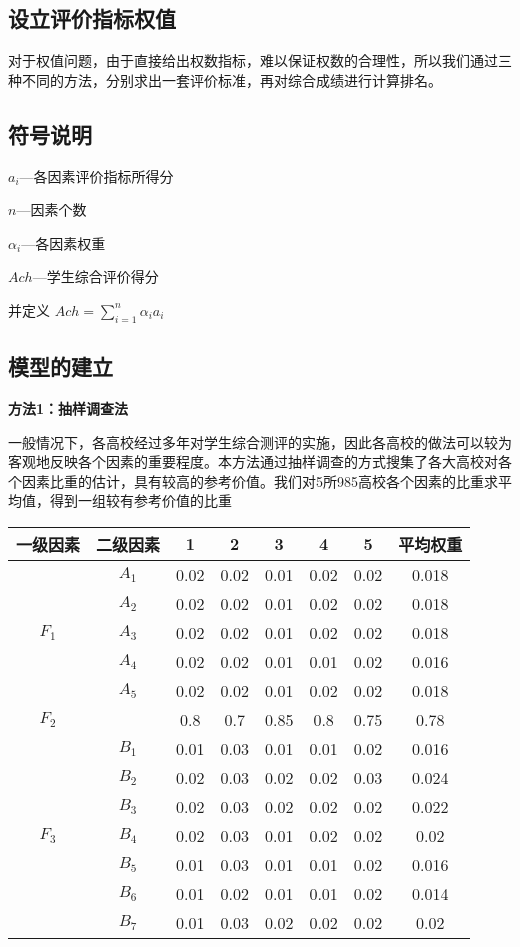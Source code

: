 \documentclass{ctexart}
\begin{document}
\subsection{设立评价指标权值}
对于权值问题，由于直接给出权数指标，难以保证权数的合理性，所以我们通过三种不同的方法，分别求出一套评价标准，再对综合成绩进行计算排名。
\subsection{符号说明}

$a_{i}$---各因素评价指标所得分

$n$---因素个数

$\alpha_{i}$---各因素权重

$Ach$---学生综合评价得分

并定义
$Ach=\sum\limits_{i=1}^{n}\alpha_{i}a_{i}$

\subsection{模型的建立}




\textbf{方法1：抽样调查法}

一般情况下，各高校经过多年对学生综合测评的实施，因此各高校的做法可以较为客观地反映各个因素的重要程度。本方法通过抽样调查的方式搜集了各大高校对各个因素比重的估计，具有较高的参考价值。我们对5所985高校各个因素的比重求平均值，得到一组较有参考价值的比重
\begin{table}[h]\small
\begin{tabular}{|c|c|c|c|c|c|c|c| }
\hline
 一级因素&	二级因素	&1&	2&	3	&4	&5&	平均权重\\
\hline
\multirow{5}{*}{$F_{1}$}&$A_{1}$& 	0.02&	0.02&	0.01&	0.02&	0.02&	0.018\\
\cline{2-8}
&$A_{2}$	&0.02	&0.02&	0.01	&0.02&	0.02&	0.018\\
\cline{2-8}
&$A_{3}$	&0.02&	0.02	&0.01	&0.02	&0.02	&0.018\\
\cline{2-8}
&$A_{4}$	&0.02	&0.02	&0.01&	0.01&	0.02	&0.016\\
\cline{2-8}
&$A_{5}$&0.02	&0.02	&0.01	&0.02	&0.02	&0.018\\
\hline
$F_{2}$&&	0.8	&0.7	&0.85	&0.8&	0.75	&0.78\\

\hline
\multirow{7}{*}{$F_{3}$}&$B_{1}$	&0.01	&0.03	&0.01&	0.01&	0.02	&0.016\\
\cline{2-8}
&$B_{2}$&	0.02&	0.03&	0.02&	0.02	&0.03	&0.024\\
\cline{2-8}
&$B_{3}$&	0.02	&0.03	&0.02&	0.02&	0.02&	0.022\\
\cline{2-8}
&$B_{4}$&	0.02	&0.03	&0.01	&0.02&	0.02&	0.02\\
\cline{2-8}
&$B_{5}$&	0.01	&0.03	&0.01	&0.01&	0.02&	0.016\\
\cline{2-8}
&$B_{6}$&	0.01	&0.02	&0.01&	0.01&	0.02&	0.014\\
\cline{2-8}
&$B_{7}$&	0.01&	0.03	&0.02	&0.02&	0.02	&0.02\\
\hline
\end{tabular}
\end{table}
\end{document}
